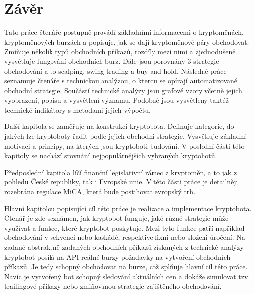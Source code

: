 \chapter{Závěr}
Tato práce čtenáře postupně provádí základními informacemi o kryptoměnách, kryptoměnových burzách a popisuje, jak se dají kryptoměnové
páry obchodovat. Zmiňuje několik typů obchodních příkazů, rozdíly mezi nimi a zjednodušeně vysvětluje fungování obchodních burz. Dále jsou
porovnány 3 strategie obchodování a to scalping, swing trading a buy-and-hold. Následně práce seznamuje čtenáře s technickou analýzou, o kterou
se opírají automatizované obchodní strategie.
Součástí technické analýzy jsou grafové vzory včetně jejich vyobrazení, popisu a vysvětlení významu. Podobně jsou vysvětleny taktéž technické
indikátory s metodami jejich výpočtu.

Další kapitola se zaměřuje na konstrukci kryptobota. Definuje kategorie, do jakých lze kryptoboty řadit podle jejich obchodní strategie. Vysvětluje
základní motivaci a principy, na kterých jsou kryptoboti budováni. V poslední části této kapitoly se nachází srovnání nejpopulárnějších vybraných
kryptobotů.

Předposlední kapitola líčí finanční legislativní rámec z kryptoměn, a to jak z pohledu České republiky, tak i Evropské unie. V této části práce je
detailněji rozebrána regulace MiCA, která bude postihovat evropský trh.

Hlavní kapitolou popisující cíl této práce je realizace a implementace kryptobota. Čtenář je zde seznámen, jak kryptobot funguje, jaké různé strategie
může využívat a funkce, které kryptobot poskytuje. Mezi tyto funkce patří například obchodování v sekvenci nebo kaskádě, respektive fixní nebo složení úročení.
Na zadané abstraktně zadaných obchodních příkazů získaných z technické analýzy kryptobot posílá na API reálné burzy požadavky na vytvoření obchodních příkazů.
Je tedy schopný obchodovat na burze, což splňuje hlavní cíl této práce. Navíc je vytvořený bot schopný sledování aktuálních cen a dokáže simulovat tzv. trailingové
příkazy nebo zmiňovanou strategie zajištěného obchodování.


\endinput
